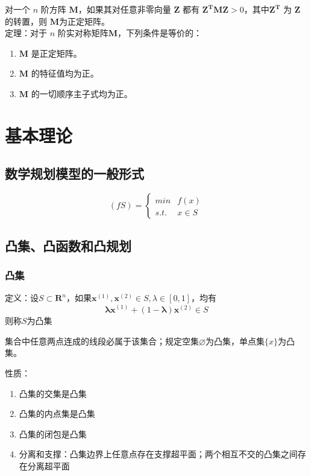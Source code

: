 \documentclass{book}
\begin{document}
对一个 $n$ 阶方阵 $\boldsymbol{M}$，如果其对任意非零向量 $\boldsymbol{Z}$ 都有 $\boldsymbol{Z^TMZ}>0$，其中$\boldsymbol{Z^T}$ 为 $\boldsymbol{Z}$ 的转置，则 $\boldsymbol{M}$为正定矩阵。\\
定理：对于 $n$ 阶实对称矩阵$\boldsymbol{M}$，下列条件是等价的：
\begin{enumerate}
    \item $\boldsymbol{M}$ 是正定矩阵。
    \item $\boldsymbol{M}$ 的特征值均为正。
    \item $\boldsymbol{M}$ 的一切顺序主子式均为正。
\end{enumerate}

\section{基本理论}
\subsection{数学规划模型的一般形式}

\begin{equation}
	(fS) = \begin{cases}
	      min & f(x) \\
	      s.t. & x \in S	
		   \end{cases}
    \label{con:general form}
\end{equation}

\subsection{凸集、凸函数和凸规划}
\subsubsection{凸集}

定义：设$S \subset \boldsymbol{R}^n$，如果$\boldsymbol{x}^{(1)}, \boldsymbol{x}^{(2)} \in S, \lambda \in [0, 1]$，均有
\begin{equation}
\boldsymbol{\lambda x}^{(1)}+(1-\boldsymbol{\lambda})\boldsymbol{x}^{(2)} \in S
\end{equation}
则称$S$为凸集

集合中任意两点连成的线段必属于该集合；规定空集$\varnothing$为凸集，单点集$\{x\}$为凸集。

性质：
\begin{enumerate}
    \item 凸集的交集是凸集
    \item 凸集的内点集是凸集
    \item 凸集的闭包是凸集
    \item 分离和支撑：凸集边界上任意点存在支撑超平面；两个相互不交的凸集之间存在分离超平面
\end{enumerate}
\end{document}

